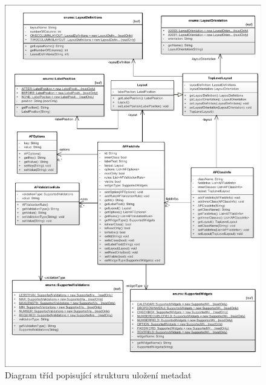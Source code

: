 \begin{figure}
\begin{center}
\includegraphics[width=\textwidth, height=\textheight]{figures/metadataClass}
\caption{Diagram tříd popisující strukturu uložení metadat}
\label{img:metadataClass}
\end{center}
\end{figure}

